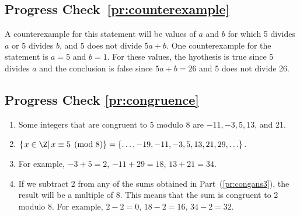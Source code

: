 \subsection*{Progress Check~\ref{pr:counterexample}}
A counterexample for this statement will be values of $a$ and $b$ for which 5 divides $a$ or 5 divides $b$, and 5 does not divide $5a + b$.  One counterexample for the statement is $a = 5$ and $b = 1$.  For these values, the hyothesis is true since 5 divides $a$ and the conclusion is false since $5a + b = 26$ and 5 does not divide 26.  

\subsection*{Progress Check \ref{pr:congruence}}
\begin{enumerate}
\item Some integers that are congruent to 5 modulo 8 are $-11, -3, 5, 13$, and 21.

\item $\left\{ \left. x \in \Z \right| x \equiv 5 \pmod 8 \right\} =
\left\{ \ldots, -19, -11, -3, 5, 13, 21, 29, \ldots \right\}$.

\item For example, $-3 + 5 = 2$, $-11 + 29 = 18$, $13 + 21 = 34$. \label{pr:congans3}

\item If we subtract 2 from any of the sums obtained in Part~(\ref{pr:congans3}), the result will be a multiple of 8.  This means that the sum is congruent to 2 modulo 8.  For example, 
$2 - 2 = 0$, $18 - 2 = 16$, $34 - 2 = 32$.
\end{enumerate}


